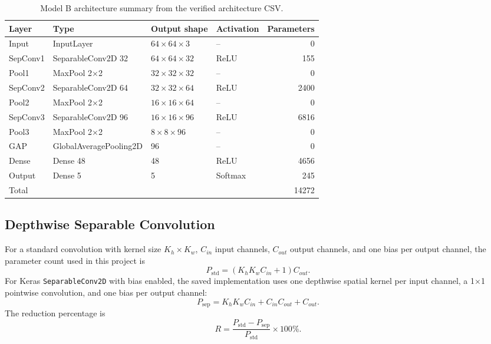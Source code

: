 \documentclass[11pt,a4paper]{article}
\begin{document}
\begin{table}[H]
\centering
\caption{Model B architecture summary from the verified architecture CSV.}
\label{tab:model_b_arch}
\begin{tabular}{llllr}
\toprule
Layer & Type & Output shape & Activation & Parameters \\
\midrule
Input & InputLayer & $64\times64\times3$ & -- & 0 \\
SepConv1 & SeparableConv2D 32 & $64\times64\times32$ & ReLU & 155 \\
Pool1 & MaxPool 2$\times$2 & $32\times32\times32$ & -- & 0 \\
SepConv2 & SeparableConv2D 64 & $32\times32\times64$ & ReLU & 2400 \\
Pool2 & MaxPool 2$\times$2 & $16\times16\times64$ & -- & 0 \\
SepConv3 & SeparableConv2D 96 & $16\times16\times96$ & ReLU & 6816 \\
Pool3 & MaxPool 2$\times$2 & $8\times8\times96$ & -- & 0 \\
GAP & GlobalAveragePooling2D & 96 & -- & 0 \\
Dense & Dense 48 & 48 & ReLU & 4656 \\
Output & Dense 5 & 5 & Softmax & 245 \\
\midrule
Total & & & & 14272 \\
\bottomrule
\end{tabular}
\end{table}

\subsection{Depthwise Separable Convolution}
For a standard convolution with kernel size $K_h\times K_w$, $C_{in}$ input channels, $C_{out}$ output channels, and one bias per output channel, the parameter count used in this project is
\begin{equation}
P_{\text{std}} = (K_hK_wC_{in}+1)C_{out}.
\end{equation}
For Keras \texttt{SeparableConv2D} with bias enabled, the saved implementation uses one depthwise spatial kernel per input channel, a 1$\times$1 pointwise convolution, and one bias per output channel:
\begin{equation}
P_{\text{sep}} = K_hK_wC_{in}+C_{in}C_{out}+C_{out}.
\end{equation}
The reduction percentage is
\begin{equation}
R = \frac{P_{\text{std}}-P_{\text{sep}}}{P_{\text{std}}}\times100\%.
\end{equation}
\end{document}
